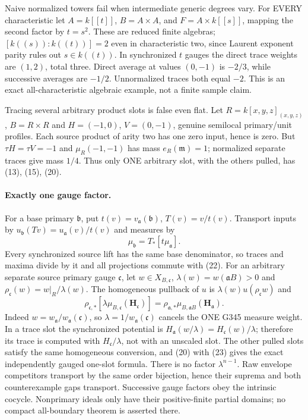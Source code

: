 \documentclass[11pt]{article}
\begin{document}
Naive normalized towers fail when intermediate generic degrees vary. For EVERY characteristic let $A=k[[t]]$, $B=A\times A$, and $F=A\times k[[s]]$, mapping the second factor by $t=s^2$. These are reduced finite algebras; $[k((s)):k((t))]=2$ even in characteristic two, since Laurent exponent parity rules out $s\in k((t))$. In synchronized $t$ gauges the direct trace weights are $(1,2)$, total three. Direct average at values $(0,-1)$ is $-2/3$, while successive averages are $-1/2$. Unnormalized traces both equal $-2$. This is an exact all-characteristic algebraic example, not a finite sample claim.

Tracing several arbitrary product slots is false even flat. Let $R=k[x,y,z]_{(x,y,z)}$, $B=R\times R$ and $H=(-1,0)$, $V=(0,-1)$, genuine semilocal primary/unit profiles. Each source product of arity two has one zero input, hence is zero. But $\tau H=\tau V=-1$ and $\mu_R(-1,-1)$ has mass $e_R(\mathfrak m)=1$; normalized separate traces give mass $1/4$. Thus only ONE arbitrary slot, with the others pulled, has (13), (15), (20).

\paragraph{Exactly one gauge factor.}
For a base primary $\mathfrak b$, put $t(v)=v_{\mathfrak a}(\mathfrak b)$, $T(v)=v/t(v)$. Transport inputs by $u_{\mathfrak b}(Tv)=u_{\mathfrak a}(v)/t(v)$ and measures by
\[
 \mu_{\mathfrak b}=T_*[t\mu_{\mathfrak a}]. \tag{22}
\]
Every synchronized source lift has the same base denominator, so traces and maxima divide by it and all projections commute with (22). For an arbitrary separate source primary gauge $\mathfrak c$, let $w\in X_{B,\mathfrak c}$,
$\lambda(w)=w(\mathfrak aB)>0$ and $\rho_{\mathfrak c}(w)=w|_R/\lambda(w)$. The homogeneous pullback of $u$ is $\lambda(w)u(\rho_{\mathfrak c}w)$ and
\[
 \rho_{\mathfrak c,*}[\lambda\mu_{B,\mathfrak c}(\boldsymbol H_{\mathfrak c})]
 =\rho_{\mathfrak a,*}\mu_{B,\mathfrak aB}(\boldsymbol H_{\mathfrak a}). \tag{23}
\]
Indeed $w=w_{\mathfrak a}/w_{\mathfrak a}(\mathfrak c)$, so $\lambda=1/w_{\mathfrak a}(\mathfrak c)$ cancels the ONE G345 measure weight. In a trace slot the synchronized potential is $H_{\mathfrak a}(w/\lambda)=H_{\mathfrak c}(w)/\lambda$; therefore its trace is computed with $H_{\mathfrak c}/\lambda$, not with an unscaled slot. The other pulled slots satisfy the same homogeneous conversion, and (20) with (23) gives the exact independently gauged one-slot formula. There is no factor $\lambda^{n-1}$. Raw envelope competitors transport by the same order bijection, hence their suprema and both counterexample gaps transport. Successive gauge factors obey the intrinsic cocycle. Nonprimary ideals only have their positive-finite partial domains; no compact all-boundary theorem is asserted there.
\end{document}
